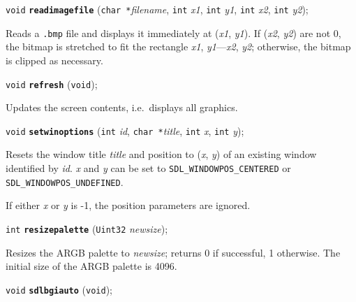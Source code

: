 \documentclass[a4paper,12pt]{article}
\newcommand{\V}{\texttt{void}}      %
\newcommand{\I}{\texttt{int}}       %
\newcommand{\Ut}{\texttt{Uint32}}   %
\newcommand{\C}{\texttt{char *}}    %
\newcommand{\func}[1]{\textbf{\texttt{#1}}}  %
\newcommand{\A}[1]{\emph{#1}}       %
\newcommand{\F}[1]{\texttt{#1}}     %
\newcommand{\T}[1]{\texttt{#1}}     %
\newenvironment{bgi}
{ %
  \begin{snugshade}
}
{ %
  \end{snugshade}
}
\begin{document}
\begin{bgi}
\V{} \func{readimagefile} (\C{}\A{filename}, \I{} \A{x1}, \I{} \A{y1},
\I{} \A{x2}, \I{} \A{y2});
\end{bgi}

Reads a \F{.bmp} file and displays it immediately at (\A{x1}, \A{y1}).
If (\A{x2}, \A{y2}) are not 0, the bitmap is stretched to fit the
rectangle \A{x1}, \A{y1}---\A{x2}, \A{y2}; otherwise, the bitmap is
clipped as necessary.


\label{sec:refresh}

\begin{bgi}
\V{} \func{refresh} (\V{});
\end{bgi}

Updates the screen contents, i.e.\ displays all graphics.


\label{sec:resetwinoptions}

\begin{bgi}
\V{} \func{setwinoptions} (\I{} \A{id}, \C{}\A{title}, \I{} \A{x}, \I{} \A{y});
\end{bgi}

Resets the window title \A{title} and position to (\A{x}, \A{y}) of an
existing window identified by \A{id}. \A{x} and \A{y} can be set to
\T{SDL\_WINDOWPOS\_CENTERED} or \T{SDL\_WINDOWPOS\_UNDEFINED}.


If either \A{x} or \A{y} is -1, the position parameters are ignored.


\label{sec:resizepalette}

\begin{bgi}
\I{} \func{resizepalette} (\Ut{} \A{newsize});
\end{bgi}

Resizes the ARGB palette to \A{newsize}; returns 0 if successful, 1
otherwise. The initial size of the ARGB palette is 4096.


\label{sec:sdlbgiauto}

\begin{bgi}
\V{} \func{sdlbgiauto} (\V{});
\end{bgi}
\end{document}
